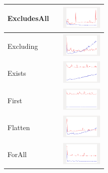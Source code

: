 \begin{longtable}{ m{2.5cm} m{8cm} m{2cm} }
ExcludesAll &

&
\includegraphics[width=2cm]{graphs/orderedset/small/ExcludesAll}
\\\hline

Excluding &

&
\includegraphics[width=2cm]{graphs/orderedset/small/Excluding}
\\\hline

Exists &

&
\includegraphics[width=2cm]{graphs/orderedset/small/Exists}
\\\hline

First &

&
\includegraphics[width=2cm]{graphs/orderedset/small/First}
\\\hline

Flatten &

&
\includegraphics[width=2cm]{graphs/orderedset/small/Flatten}
\\\hline

ForAll &

&
\includegraphics[width=2cm]{graphs/orderedset/small/forALL}
\\\hline


\end{longtable}
